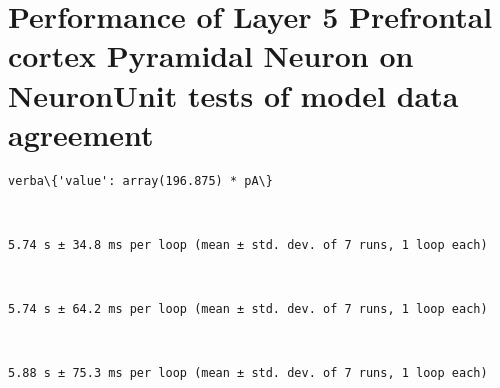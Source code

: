     

    
\section{Performance of Layer 5 Prefrontal cortex Pyramidal Neuron on
NeuronUnit tests of model data
agreement}

    \begin{Verbatim}[commandchars=\\\{\}]
verba\{'value': array(196.875) * pA\}
    \end{Verbatim}

    \begin{center}
    \end{center}
    { \hspace*{\fill} \\}
    
    \begin{Verbatim}[commandchars=\\\{\}]
5.74 s ± 34.8 ms per loop (mean ± std. dev. of 7 runs, 1 loop each)
    \end{Verbatim}

    \begin{center}
    \end{center}
    { \hspace*{\fill} \\}
    
    \begin{Verbatim}[commandchars=\\\{\}]
5.74 s ± 64.2 ms per loop (mean ± std. dev. of 7 runs, 1 loop each)
    \end{Verbatim}

    \begin{center}
    \end{center}
    { \hspace*{\fill} \\}
    
    \begin{Verbatim}[commandchars=\\\{\}]
5.88 s ± 75.3 ms per loop (mean ± std. dev. of 7 runs, 1 loop each)
    \end{Verbatim}

